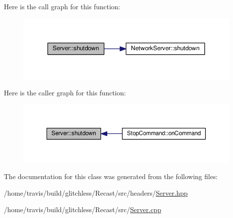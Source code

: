 Here is the call graph for this function\-:
\nopagebreak
\begin{figure}[H]
\begin{center}
\leavevmode
\includegraphics[width=340pt]{class_server_a58c74bafaaf20b24e9243c7cf5fdfd16_cgraph}
\end{center}
\end{figure}




Here is the caller graph for this function\-:
\nopagebreak
\begin{figure}[H]
\begin{center}
\leavevmode
\includegraphics[width=350pt]{class_server_a58c74bafaaf20b24e9243c7cf5fdfd16_icgraph}
\end{center}
\end{figure}




The documentation for this class was generated from the following files\-:\begin{DoxyCompactItemize}
\item 
/home/travis/build/glitchless/\-Recast/src/headers/\hyperlink{_server_8hpp}{Server.\-hpp}\item 
/home/travis/build/glitchless/\-Recast/src/\hyperlink{_server_8cpp}{Server.\-cpp}\end{DoxyCompactItemize}
